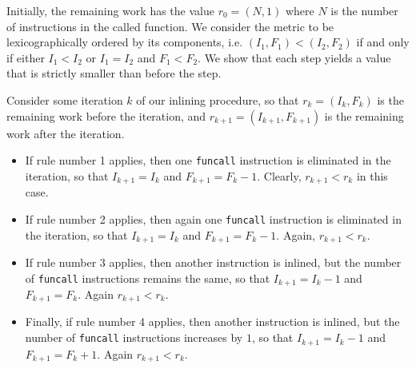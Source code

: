 Initially, the remaining work has the value $r_0 = (N,1)$ where $N$ is
the number of instructions in the called function.  We consider the
metric to be lexicographically ordered by its components, i.e. $(I_1,
F_1) < (I_2, F_2)$ if and only if either $I_1 < I_2$ or $I_1 = I_2$
and $F_1 < F_2$.  We show that each step yields a value that is
strictly smaller than before the step.

Consider some iteration $k$ of our inlining procedure, so that $r_k =
(I_k,F_k)$ is the remaining work before the iteration, and $r_{k+1} =
(I_{k+1},F_{k+1})$ is the remaining work after the iteration.

\begin{itemize}
\item If rule number 1 applies, then one \texttt{funcall} instruction
  is eliminated in the iteration, so that $I_{k+1} = I_k$ and $F_{k+1}
  = F_k-1$.  Clearly, $r_{k+1} < r_k$ in this case.
\item If rule number 2 applies, then again one \texttt{funcall}
  instruction is eliminated in the iteration, so that $I_{k+1} = I_k$
  and $F_{k+1} = F_k-1$.  Again, $r_{k+1} < r_k$.
\item If rule number 3 applies, then another instruction is inlined,
  but the number of \texttt{funcall} instructions remains the same, so
  that $I_{k+1} = I_k-1$ and $F_{k+1} = F_k$.  Again $r_{k+1} < r_k$.
\item Finally, if rule number 4 applies, then another instruction is inlined,
  but the number of \texttt{funcall} instructions increases by $1$, so
  that $I_{k+1} = I_k-1$ and $F_{k+1} = F_k+1$.  Again $r_{k+1} < r_k$.
\end{itemize}

\begin{figure}
\end{figure}

\begin{figure}
\end{figure}

\begin{figure}
\end{figure}

\begin{figure}
\end{figure}

